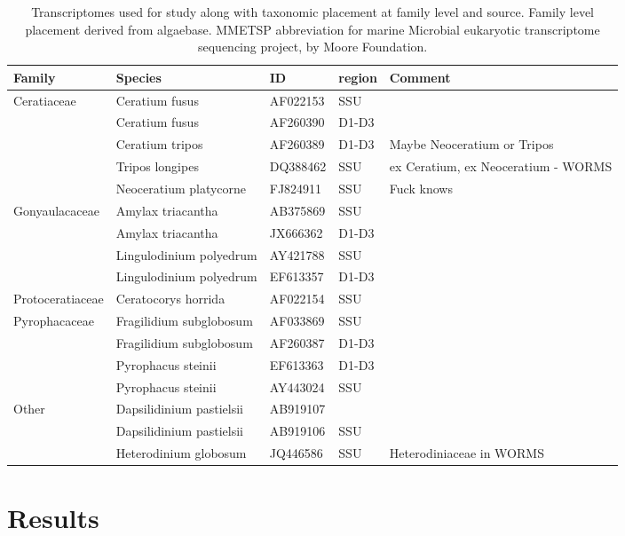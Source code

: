 \documentclass[12pt]{article}
\begin{document}
\FloatBarrier
\begin{table}
\caption{Transcriptomes used for study along with taxonomic placement at family level and source. Family level placement derived from algaebase. MMETSP abbreviation for marine Microbial eukaryotic transcriptome sequencing project, by Moore Foundation.}
\label{tbl:Transcriptomes}
\begin{tabular}{  | p{3cm} |p{4cm} | p{2cm} | p{3cm} | p{3cm}  |}
\hline
\textbf{Family}&\textbf{Species}&\textbf{ID}& \textbf{region} &\textbf{Comment}\\
\hline
Ceratiaceae& Ceratium fusus&AF022153&SSU&\\
\hline
&Ceratium fusus&AF260390&D1-D3&\\
\hline
&Ceratium tripos&AF260389&D1-D3&Maybe Neoceratium or Tripos\\
&Tripos longipes&DQ388462&SSU&ex Ceratium, ex Neoceratium - WORMS\\
\hline
&Neoceratium platycorne&FJ824911&SSU&Fuck knows\\
\hline
Gonyaulacaceae&Amylax triacantha&AB375869&SSU&\\
\hline
&Amylax triacantha&JX666362&D1-D3&\\
\hline
&Lingulodinium polyedrum&AY421788&SSU&\\
\hline
&Lingulodinium polyedrum&EF613357&D1-D3&\\
\hline
Protoceratiaceae&Ceratocorys horrida&AF022154&SSU&\\
\hline
Pyrophacaceae&Fragilidium subglobosum&AF033869&SSU&\\
\hline
&Fragilidium subglobosum&AF260387&D1-D3&\\
\hline
&Pyrophacus steinii&EF613363&D1-D3&\\
\hline
&Pyrophacus steinii&AY443024&SSU&\\
\hline
Other&Dapsilidinium pastielsii&AB919107&&\\
&Dapsilidinium pastielsii&AB919106&SSU&\\
&Heterodinium globosum&JQ446586&SSU&Heterodiniaceae in WORMS\\
\hline
\end{tabular}
\end{table}

\newpage
\section{Results}

\end{document}
